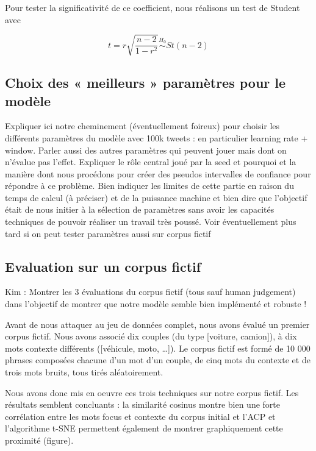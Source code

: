\documentclass[11pt,french,french]{article}
\begin{document}
Pour tester la significativité de ce coefficient, nous réalisons un test
de Student avec

\[t = r\sqrt{\frac{n-2}{1-r^2}}\overset{H_0}{\sim} St(n-2)\]

\hypertarget{choix-des-meilleurs-paramuxe8tres-pour-le-moduxe8le}{%
\subsection{Choix des « meilleurs » paramètres pour le
modèle}\label{choix-des-meilleurs-paramuxe8tres-pour-le-moduxe8le}}

Expliquer ici notre cheminement (éventuellement foireux) pour choisir
les différents paramètres du modèle avec 100k tweets : en particulier
learning rate + window. Parler aussi des autres paramètres qui peuvent
jouer mais dont on n'évalue pas l'effet. Expliquer le rôle central joué
par la seed et pourquoi et la manière dont nous procédons pour créer des
pseudos intervalles de confiance pour répondre à ce problème. Bien
indiquer les limites de cette partie en raison du temps de calcul (à
préciser) et de la puissance machine et bien dire que l'objectif était
de nous initier à la sélection de paramètres sans avoir les capacités
techniques de pouvoir réaliser un travail très poussé. Voir
éventuellement plus tard si on peut tester paramètres aussi sur corpus
fictif

\hypertarget{evaluation-sur-un-corpus-fictif}{%
\subsection{Evaluation sur un corpus
fictif}\label{evaluation-sur-un-corpus-fictif}}

Kim : Montrer les 3 évaluations du corpus fictif (tous sauf human
judgement) dans l'objectif de montrer que notre modèle semble bien
implémenté et robuste !

Avant de nous attaquer au jeu de données complet, nous avons évalué un
premier corpus fictif. Nous avons associé dix couples (du type
{[}voiture, camion{]}), à dix mots contexte différents ({[}véhicule,
moto, \dots{]}). Le corpus fictif est formé de 10 000 phrases composées
chacune d'un mot d'un couple, de cinq mots du contexte et de trois mots
bruits, tous tirés aléatoirement.

Nous avons donc mis en oeuvre ces trois techniques sur notre corpus
fictif. Les résultats semblent concluants : la similarité cosinus montre
bien une forte corrélation entre les mots focus et contexte du corpus
initial et l'ACP et l'algorithme t-SNE permettent également de montrer
graphiquement cette proximité (figure).
\end{document}
